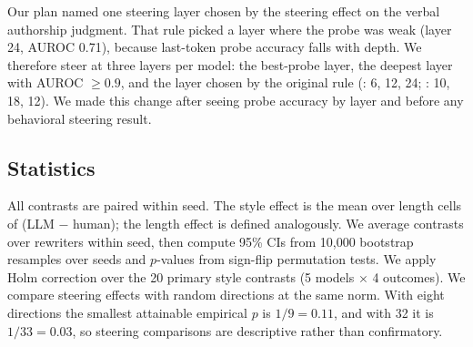Our plan named one steering layer chosen by the steering effect on the verbal authorship judgment.
That rule picked a layer where the probe was weak (\llama layer 24, AUROC 0.71), because last-token probe accuracy falls with depth.
We therefore steer at three layers per model: the best-probe layer, the deepest layer with AUROC $\geq0.9$, and the layer chosen by the original rule (\llama: 6, 12, 24; \qwen: 10, 18, 12).
We made this change after seeing probe accuracy by layer and before any behavioral steering result.

\subsection{Statistics}
\label{sec:stats}

All contrasts are paired within seed.
The style effect is the mean over length cells of (LLM $-$ human); the length effect is defined analogously.
We average contrasts over rewriters within seed, then compute 95\% CIs from 10{,}000 bootstrap resamples over seeds and $p$-values from sign-flip permutation tests.
We apply Holm correction over the 20 primary style contrasts (5 models $\times$ 4 outcomes).
We compare steering effects with random directions at the same norm.
With eight directions the smallest attainable empirical $p$ is $1/9=0.11$, and with 32 it is $1/33=0.03$, so steering comparisons are descriptive rather than confirmatory.

